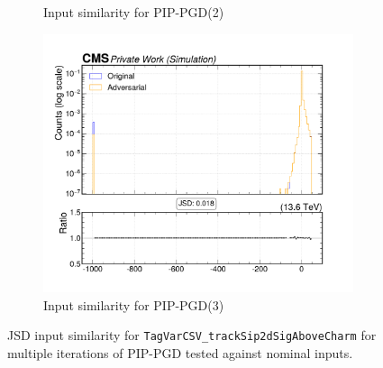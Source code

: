 \begin{figure}[htbp]
\begin{subfigure}[t]{0.32\textwidth}
    \caption*{Input similarity for PIP-PGD(2)}
  \end{subfigure}\hfill
  \begin{subfigure}[t]{0.32\textwidth}
    \includegraphics[width=\linewidth]{media/output/features/compare/combined_it_3/cmp_global_features_TagVarCSV_trackSip2dSigAboveCharm.pdf}
    \caption*{Input similarity for PIP-PGD(3)}
  \end{subfigure}

  \caption*{JSD input similarity for \texttt{TagVarCSV\_trackSip2dSigAboveCharm} for multiple iterations of PIP-PGD tested against nominal inputs.}
  \label{fig:combined_input_TagVarCSV_trackSip2dSigAboveCharm}
\end{figure}

